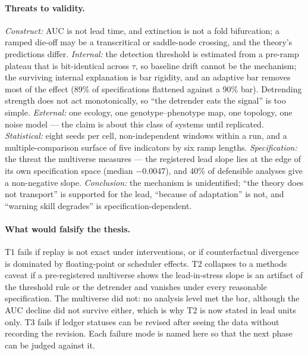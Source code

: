 \documentclass[11pt,a4paper]{article}
\begin{document}
\paragraph{Threats to validity.}
\emph{Construct:} AUC is not lead time, and extinction is not a fold
bifurcation; a ramped die-off may be a transcritical or saddle-node crossing, and
the theory's predictions differ. \emph{Internal:} the detection threshold is
estimated from a pre-ramp plateau that is bit-identical across $\tau$, so baseline
drift cannot be the mechanism; the surviving internal explanation is bar
rigidity, and an adaptive bar removes most of the effect (89\% of specifications
flattened against a 90\% bar). Detrending strength does not act monotonically, so
``the detrender eats the signal'' is too simple.
\emph{External:} one ecology, one genotype--phenotype map, one topology, one
noise model --- the claim is about this class of systems until replicated.
\emph{Statistical:} eight seeds per cell, non-independent windows within a run,
and a multiple-comparison surface of five indicators by six ramp lengths.
\emph{Specification:} the threat the multiverse measures --- the registered lead
slope lies at the edge of its own specification space (median $-0.0047$), and
40\% of defensible analyses give a non-negative slope.
\emph{Conclusion:} the mechanism is unidentified; ``the theory does not
transport'' is supported for the lead, ``because of adaptation'' is not, and
``warning skill degrades'' is specification-dependent.

\paragraph{What would falsify the thesis.} T1 fails if replay is not exact under
interventions, or if counterfactual divergence is dominated by floating-point or
scheduler effects. T2 collapses to a methods caveat if a pre-registered
multiverse shows the lead-in-stress slope is an artifact of the threshold rule or
the detrender and vanishes under every reasonable specification. The multiverse
did not: no analysis level met the bar, although the AUC decline did not survive
either, which is why T2 is now stated in lead units only. T3 fails if
ledger statuses can be revised after seeing the data without recording the
revision. Each failure mode is named here so that the next phase can be judged
against it.
\end{document}
